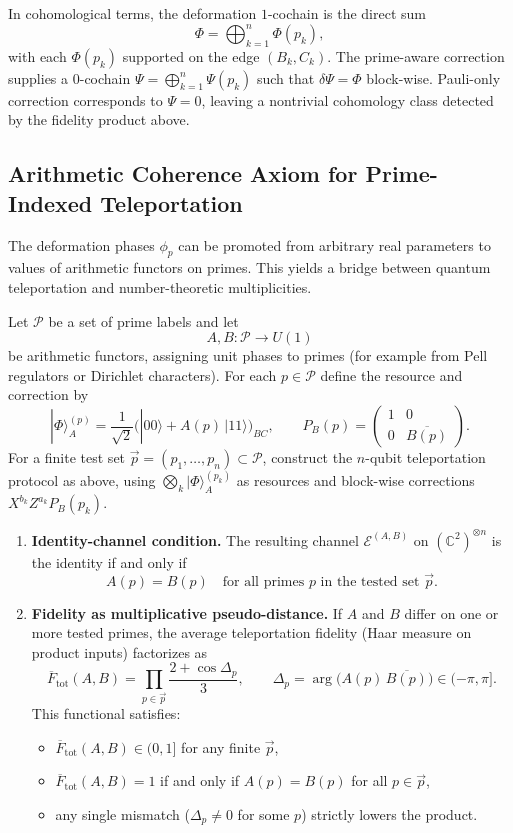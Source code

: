 \documentclass[11pt]{article}
\begin{document}
In cohomological terms, the deformation $1$-cochain is the direct sum
\[
\Phi = \bigoplus_{k=1}^n \Phi(p_k),
\]
with each $\Phi(p_k)$ supported on the edge $(B_k,C_k)$. The prime-aware correction supplies a $0$-cochain $\Psi = \bigoplus_{k=1}^n \Psi(p_k)$ such that $\delta\Psi = \Phi$ block-wise. Pauli-only correction corresponds to $\Psi = 0$, leaving a nontrivial cohomology class detected by the fidelity product above.

\subsection{Arithmetic Coherence Axiom for Prime-Indexed Teleportation}

The deformation phases $\phi_p$ can be promoted from arbitrary real parameters to values of arithmetic functors on primes. This yields a bridge between quantum teleportation and number-theoretic multiplicities.

\begin{axiom}
Let $\mathcal{P}$ be a set of prime labels and let
\[
A,B : \mathcal{P} \longrightarrow U(1)
\]
be arithmetic functors, assigning unit phases to primes (for example from Pell regulators or Dirichlet characters). For each $p\in\mathcal{P}$ define the resource and correction by
\[
|\Phi\rangle_A^{(p)} = \frac{1}{\sqrt{2}}\bigl(|00\rangle + A(p)\,|11\rangle\bigr)_{BC},
\qquad
P_B(p) = \begin{pmatrix} 1 & 0 \\ 0 & \overline{B(p)} \end{pmatrix}.
\]
For a finite test set $\vec p=(p_1,\dots,p_n)\subset\mathcal{P}$, construct the $n$-qubit teleportation protocol as above, using $\bigotimes_k |\Phi\rangle_A^{(p_k)}$ as resources and block-wise corrections $X^{b_k}Z^{a_k}P_B(p_k)$.

\begin{enumerate}
\item \textbf{Identity-channel condition.} The resulting channel $\mathcal{E}^{(A,B)}$ on $(\mathbb{C}^2)^{\otimes n}$ is the identity if and only if
\[
A(p) = B(p) \quad\text{for all primes } p \text{ in the tested set } \vec p.
\]
\item \textbf{Fidelity as multiplicative pseudo-distance.} If $A$ and $B$ differ on one or more tested primes, the average teleportation fidelity (Haar measure on product inputs) factorizes as
\[
\overline{F}_{\mathrm{tot}}(A,B)
= \prod_{p\in\vec p} \frac{2+\cos\Delta_p}{3},
\qquad
\Delta_p = \arg\bigl(A(p)\,\overline{B(p)}\bigr) \in (-\pi,\pi].
\]
This functional satisfies:
\begin{itemize}
\item $\overline{F}_{\mathrm{tot}}(A,B) \in (0,1]$ for any finite $\vec p$,
\item $\overline{F}_{\mathrm{tot}}(A,B) = 1$ if and only if $A(p)=B(p)$ for all $p\in\vec p$,
\item any single mismatch ($\Delta_p\neq 0$ for some $p$) strictly lowers the product.
\end{itemize}
\end{enumerate}
\end{axiom}
\end{document}
